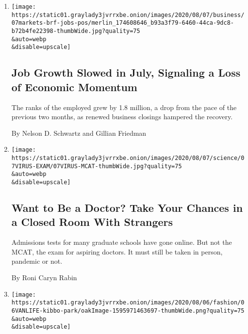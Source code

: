 \begin{enumerate}
\def\labelenumi{\arabic{enumi}.}
\item
  \href{/2020/08/07/business/economy/july-jobs-report.html}{}

  \texttt{[image: https://static01.graylady3jvrrxbe.onion/images/2020/08/07/business/07markets-brf-jobs-pos/merlin\_174608646\_b93a3f79-6460-44ca-9dc8-b72b4fe22398-thumbWide.jpg?quality=75\\\&auto=webp\\\&disable=upscale]}

  \hypertarget{job-growth-slowed-in-july-signaling-a-loss-of-economic-momentum}{%
  \subsection{Job Growth Slowed in July, Signaling a Loss of Economic
  Momentum}\label{job-growth-slowed-in-july-signaling-a-loss-of-economic-momentum}}

  The ranks of the employed grew by 1.8 million, a drop from the pace of
  the previous two months, as renewed business closings hampered the
  recovery.

  By Nelson D. Schwartz and Gillian Friedman
\item
  \href{/2020/08/07/health/coronavirus-exams-mcat.html}{}

  \texttt{[image: https://static01.graylady3jvrrxbe.onion/images/2020/08/07/science/07VIRUS-EXAM/07VIRUS-MCAT-thumbWide.jpg?quality=75\\\&auto=webp\\\&disable=upscale]}

  \hypertarget{want-to-be-a-doctor-take-your-chances-in-a-closed-room-with-strangers}{%
  \subsection{Want to Be a Doctor? Take Your Chances in a Closed Room
  With
  Strangers}\label{want-to-be-a-doctor-take-your-chances-in-a-closed-room-with-strangers}}

  Admissions tests for many graduate schools have gone online. But not
  the MCAT, the exam for aspiring doctors. It must still be taken in
  person, pandemic or not.

  By Roni Caryn Rabin
\item
  \href{/2020/08/07/style/kibbo-van-life-startup.html}{}

  \texttt{[image: https://static01.graylady3jvrrxbe.onion/images/2020/08/06/fashion/06VANLIFE-kibbo-park/oakImage-1595971463697-thumbWide.png?quality=75\\\&auto=webp\\\&disable=upscale]}

  \hypertarget{what-if-your-home-could-be-mobile-but-also-you-could-park-it}{%
}
\end{enumerate}
